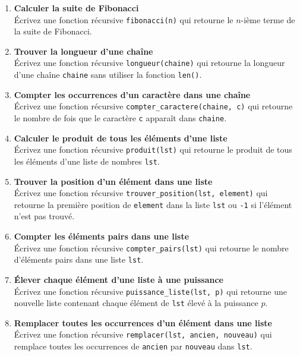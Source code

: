 \begin{enumerate}
    \item \textbf{Calculer la suite de Fibonacci} \\
    Écrivez une fonction récursive \texttt{fibonacci(n)} qui retourne le $n$-ième terme de la suite de Fibonacci.

    \item \textbf{Trouver la longueur d'une chaîne} \\
    Écrivez une fonction récursive \texttt{longueur(chaine)} qui retourne la longueur d'une chaîne \texttt{chaine} sans utiliser la fonction \texttt{len()}.

    \item \textbf{Compter les occurrences d'un caractère dans une chaîne} \\
    Écrivez une fonction récursive \texttt{compter\_caractere(chaine, c)} qui retourne le nombre de fois que le caractère \texttt{c} apparaît dans \texttt{chaine}.

    \item \textbf{Calculer le produit de tous les éléments d'une liste} \\
    Écrivez une fonction récursive \texttt{produit(lst)} qui retourne le produit de tous les éléments d'une liste de nombres \texttt{lst}.

    \item \textbf{Trouver la position d'un élément dans une liste} \\
    Écrivez une fonction récursive \texttt{trouver\_position(lst, element)} qui retourne la première position de \texttt{element} dans la liste \texttt{lst} ou \texttt{-1} si l'élément n'est pas trouvé.

    \item \textbf{Compter les éléments pairs dans une liste} \\
    Écrivez une fonction récursive \texttt{compter\_pairs(lst)} qui retourne le nombre d'éléments pairs dans une liste \texttt{lst}.

    \item \textbf{Élever chaque élément d'une liste à une puissance} \\
    Écrivez une fonction récursive \texttt{puissance\_liste(lst, p)} qui retourne une nouvelle liste contenant chaque élément de \texttt{lst} élevé à la puissance $p$.

    \item \textbf{Remplacer toutes les occurrences d'un élément dans une liste} \\
    Écrivez une fonction récursive \texttt{remplacer(lst, ancien, nouveau)} qui remplace toutes les occurrences de \texttt{ancien} par \texttt{nouveau} dans \texttt{lst}.


\end{enumerate}
